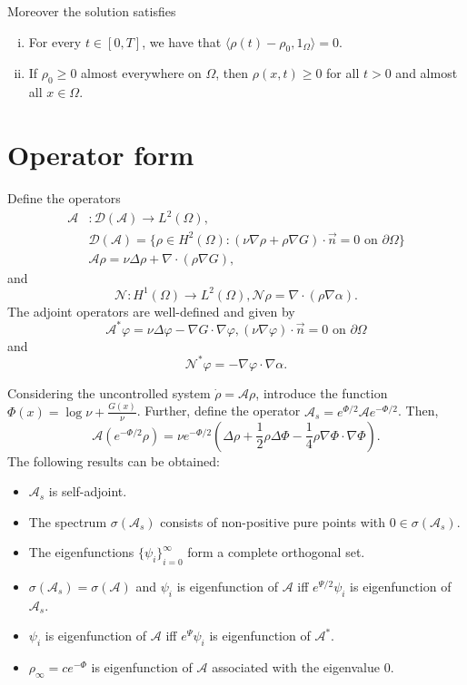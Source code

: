 \documentclass[12pt]{article}
\newcommand{\n}{\vec{n}}
\newcommand{\steady}{\rho_{\infty}}
\newcommand{\inner}[2]{\langle{} #1, #2 \rangle{}}
\theoremstyle{definition}
\begin{document}
Moreover the solution satisfies
\begin{enumerate}[(i)]
    \item For every $t \in [0,T]$, we have that $\inner{\rho(t) - \rho_0}{1_{\Omega}} = 0$.
    \item If $\rho_0 \ge 0$ almost everywhere on $\Omega$, then $\rho(x,t) \ge 0$ for all $t > 0$ and almost all $x \in \Omega$.
\end{enumerate}

\section{Operator form}

Define the operators 
\[
\begin{split}
    \mathcal{A} &: \mathcal{D}(\mathcal{A}) \to L^2(\Omega), \\
    &\mathcal{D}(\mathcal{A}) = \{\rho \in H^2(\Omega) : (\nu \nabla \rho + \rho \nabla G) \cdot \n = 0 \text{ on } \partial \Omega\} \\
    &\mathcal{A} \rho = \nu \Delta \rho + \nabla \cdot (\rho \nabla G),   
\end{split}
\]
and
\[
\mathcal{N} : H^1(\Omega) \to L^2(\Omega), \mathcal{N}\rho = \nabla \cdot (\rho \nabla \alpha).    
\]
The adjoint operators are well-defined and given by 
\[
\mathcal{A}^*\varphi = \nu \Delta \varphi - \nabla G \cdot \nabla \varphi, (\nu \nabla \varphi) \cdot \n = 0 \text{ on } \partial \Omega    
\]
and 
\[
\mathcal{N}^* \varphi = - \nabla \varphi \cdot  \nabla \alpha. 
\]

Considering the uncontrolled system $\dot{\rho} = \mathcal{A} \rho$, introduce the function $\Phi(x) = \log \nu + \frac{G(x)}{\nu}$.
Further, define the operator $\mathcal{A}_s = e^{\Phi/2}\mathcal{A}e^{-\Phi/2}$.
Then,
\[
\mathcal{A}\left(e^{-\Phi/2} \rho \right) = \nu e^{-\Phi/2}\left(\Delta \rho + \frac{1}{2}\rho\Delta \Phi - \frac{1}{4}\rho \nabla \Phi \cdot \nabla \Phi \right).
\]
The following results can be obtained:
\begin{itemize}
    \item $\mathcal{A}_s$ is self-adjoint.
    \item The spectrum $\sigma(\mathcal{A}_s)$ consists of non-positive pure points with $0 \in \sigma(\mathcal{A}_s)$.
    \item The eigenfunctions ${\{\psi_i\}}_{i=0}^{\infty}$ form a complete orthogonal set.
    \item $\sigma(\mathcal{A}_s) = \sigma(\mathcal{A})$ and $\psi_i$ is eigenfunction of $\mathcal{A}$ iff $e^{\Psi/2}\psi_i$ is eigenfunction of $\mathcal{A}_s$. 
    \item $\psi_i$ is eigenfunction of $\mathcal{A}$ iff $e^{\Psi}\psi_i$ is eigenfunction of $\mathcal{A}^*$. 
    \item $\steady = ce^{-\Phi}$ is eigenfunction of $\mathcal{A}$ associated with the eigenvalue $0$.
\end{itemize}
\end{document}
